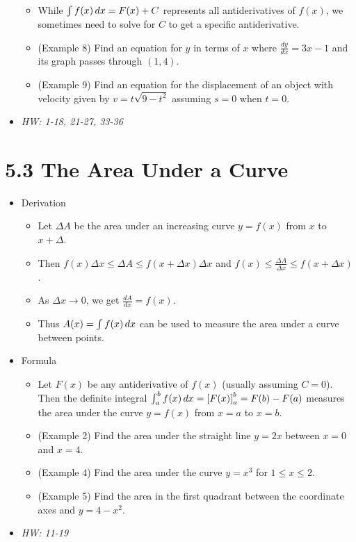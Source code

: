 \documentclass[11pt]{article}
\begin{document}
\begin{itemize}
\begin{itemize}
    \item While \(\int f(x)\,d x=F(x)+C\) represents all antiderivatives
          of \(f(x)\), we sometimes need to solve for \(C\) to get a specific
          antiderivative.
    \item (Example 8) Find an equation for \(y\) in terms of \(x\) where
          \(\frac{dy}{dx}=3x-1\) and its graph passes through \((1,4)\).
    \item (Example 9) Find an equation for the displacement of an object
          with velocity given by \(v=t\sqrt{9-t^2}\) assuming \(s=0\)
          when \(t=0\).
  \end{itemize}
\item\textit{
  HW: 1-18, 21-27, 33-36
}
\end{itemize}

\section*{5.3 The Area Under a Curve}

\begin{itemize}
\item Derivation
  \begin{itemize}
    \item Let \(\Delta A\) be the area under an increasing curve \(y=f(x)\) from
          \(x\) to \(x+\Delta\).
    \item Then \(f(x)\Delta x\leq \Delta A\leq f(x+\Delta x)\Delta x\)
          and \(f(x)\leq\frac{\Delta A}{\Delta x}\leq f(x+\Delta x)\).
    \item As \(\Delta x\to 0\), we get \(\frac{dA}{dx}=f(x)\).
    \item Thus \(A(x)=\int f(x)\,d x\)
          can be used to measure the area under a curve between points.
  \end{itemize}
\item Formula
  \begin{itemize}
    \item Let \(F(x)\) be any antiderivative of \(f(x)\) (usually assuming
          \(C=0\)). Then the definite integral
          \(\int_a^b f(x)\,d x = \left[F(x)\right]_a^b=F(b)-F(a)\) measures
          the area under the curve \(y=f(x)\) from \(x=a\) to \(x=b\).
    \item (Example 2) Find the area under the straight line \(y=2x\)
          between \(x=0\) and \(x=4\).
    \item (Example 4) Find the area under the curve \(y=x^3\) for
          \(1\leq x\leq 2\).
    \item (Example 5) Find the area in the first quadrant between the
          coordinate axes and \(y=4-x^2\).
  \end{itemize}
\item\textit{
  HW: 11-19
}
\end{itemize}
\end{document}

